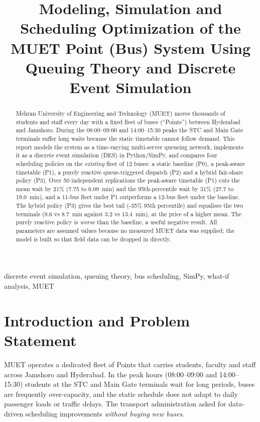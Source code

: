 \documentclass[conference]{IEEEtran}
\begin{document}
\title{Modeling, Simulation and Scheduling Optimization of the MUET Point (Bus) System Using Queuing Theory and Discrete Event Simulation}

\author{
}

\maketitle

\begin{abstract}
Mehran University of Engineering and Technology (MUET) moves thousands of students and staff every day with a fixed fleet of buses (``Points'') between Hyderabad and Jamshoro. During the 08:00--09:00 and 14:00--15:30 peaks the STC and Main Gate terminals suffer long waits because the static timetable cannot follow demand. This report models the system as a time-varying multi-server queueing network, implements it as a discrete event simulation (DES) in Python/SimPy, and compares four scheduling policies on the \emph{existing} fleet of 12 buses: a static baseline (P0), a peak-aware timetable (P1), a purely reactive queue-triggered dispatch (P2) and a hybrid fair-share policy (P3). Over 50 independent replications the peak-aware timetable (P1) cuts the mean wait by 21\% (7.75 to 6.09~min) and the 95th-percentile wait by 31\% (27.7 to 19.0~min), and a 11-bus fleet under P1 outperforms a 12-bus fleet under the baseline. The hybrid policy (P3) gives the best tail (-35\% 95th percentile) and equalises the two terminals (8.6 vs 8.7~min against 3.2 vs 13.4~min), at the price of a higher mean. The purely reactive policy is \emph{worse} than the baseline, a useful negative result. All parameters are assumed values because no measured MUET data was supplied; the model is built so that field data can be dropped in directly.
\end{abstract}

\begin{IEEEkeywords}
discrete event simulation, queuing theory, bus scheduling, SimPy, what-if analysis, MUET
\end{IEEEkeywords}

\section{Introduction and Problem Statement}
MUET operates a dedicated fleet of Points that carries students, faculty and staff across Jamshoro and Hyderabad. In the peak hours (08:00--09:00 and 14:00--15:30) students at the STC and Main Gate terminals wait for long periods, buses are frequently over-capacity, and the static schedule does not adapt to daily passenger loads or traffic delays. The transport administration asked for data-driven scheduling improvements \emph{without buying new buses}.
\end{document}
